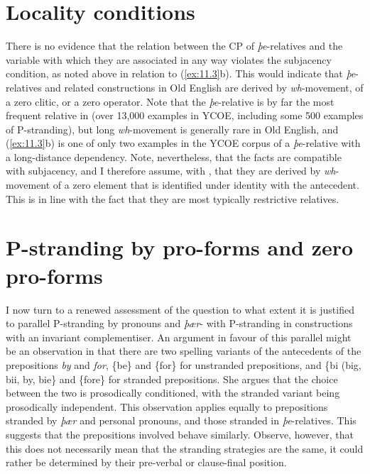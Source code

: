 \documentclass[output=paper]{langsci/langscibook}
\begin{document}
\section{Locality conditions}

There is no evidence that the relation between the CP of \textit{þe}-relatives
and the variable with which they are associated in any way violates the
subjacency condition, as noted above in relation to (\ref{ex:11.3}b). This
would indicate that \textit{þe}-relatives and related constructions in Old
English are derived by \textit{wh}-movement, of a zero
clitic, or a zero operator. Note that the \textit{þe}-relative is
by far the most frequent relative in  (over 13,000 examples in
YCOE, including some 500 examples of P-stranding),  but long
\textit{wh}-movement is generally rare in Old English, and (\ref{ex:11.3}b)
is one of only two examples in the YCOE corpus of a \textit{þe}-relative with a
long-distance dependency. Note, nevertheless, that the facts are compatible
with subjacency, and I therefore assume, with \citet{vanKemenade1987}, that
they are derived by \textit{wh}-movement of a zero element
that is identified under identity with the antecedent. This is in line with the
fact that they are most typically restrictive relatives.

\section{P-stranding by pro-forms and zero pro-forms}

I now turn to a renewed assessment of the question to what extent it is
justified to parallel P-stranding by pronouns and \textit{þær}- with
P-stranding  in constructions with an invariant complementiser. An argument in
favour of this parallel might be an observation in \citet{Alcorn2014} that
there are two spelling variants of the  antecedents of the
prepositions \textit{by} and \textit{for}, \{be\} and \{for\} for unstranded
prepositions, and \{bi (big, bii, by, bie\} and \{fore\} for stranded
prepositions.  She argues that the choice between the two is prosodically
conditioned, with the stranded variant being prosodically independent. This
observation applies equally to prepositions stranded by \textit{þær} and
personal pronouns, and those stranded in \textit{þe}-relatives. This suggests
that the prepositions involved behave similarly. Observe, however, that this
does not necessarily mean that the stranding strategies are the same, it could
rather be determined by their pre-verbal or clause-final position.
\end{document}

